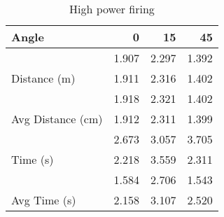 \documentclass [12pt, letterpaper, twoside] {article}
\begin{document}
  \begin {table}[h]
   \centering
    \begin {tabular} {| l | r | r | r |}
      \hline\hline
      Angle & 0 & 15 & 45 \\
      \hline
      \multirow {3}{*}{Distance (m)} & 1.907 & 2.297 & 1.392 \\ 
      & 1.911 & 2.316 & 1.402 \\
      & 1.918 & 2.321 & 1.402 \\
      \hline
      Avg Distance (cm) & 1.912 & 2.311 & 1.399 \\
      \hline
      \multirow {3}{*}{Time (s)} & 2.673 & 3.057 & 3.705 \\
      & 2.218 & 3.559 & 2.311 \\
      & 1.584 & 2.706 & 1.543 \\
      \hline
      Avg Time (s) & 2.158 & 3.107 & 2.520 \\
      \hline\hline
    \end {tabular}
    \caption {High power firing}
  \end {table}
\end{document}
